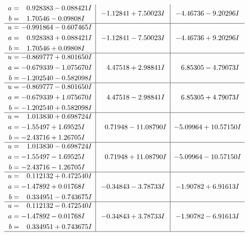 \documentclass[1p]{elsarticle_modified}
\theoremstyle{definition}
\begin{document}
$$\begin{array}{c|c|c}
\begin{aligned}
a &= \phantom{-}0.928383 - 0.088421 I \\
b &= \phantom{-}1.70546 - 0.09808 I\end{aligned}
 & -1.12841 + 7.50023 I & -4.46736 - 9.20296 I \\ \hline\begin{aligned}
u &= -0.991864 - 0.607465 I \\
a &= \phantom{-}0.928383 + 0.088421 I \\
b &= \phantom{-}1.70546 + 0.09808 I\end{aligned}
 & -1.12841 - 7.50023 I & -4.46736 + 9.20296 I \\ \hline\begin{aligned}
u &= -0.869777 + 0.801650 I \\
a &= -0.679339 - 1.075670 I \\
b &= -1.202540 - 0.582098 I\end{aligned}
 & \phantom{-}4.47518 + 2.98841 I & \phantom{-}6.85305 - 4.79073 I \\ \hline\begin{aligned}
u &= -0.869777 - 0.801650 I \\
a &= -0.679339 + 1.075670 I \\
b &= -1.202540 + 0.582098 I\end{aligned}
 & \phantom{-}4.47518 - 2.98841 I & \phantom{-}6.85305 + 4.79073 I \\ \hline\begin{aligned}
u &= \phantom{-}1.013830 + 0.698724 I \\
a &= -1.55497 + 1.69525 I \\
b &= -2.43716 + 1.26705 I\end{aligned}
 & \phantom{-}0.71948 - 11.08790 I & -5.09964 + 10.57150 I \\ \hline\begin{aligned}
u &= \phantom{-}1.013830 - 0.698724 I \\
a &= -1.55497 - 1.69525 I \\
b &= -2.43716 - 1.26705 I\end{aligned}
 & \phantom{-}0.71948 + 11.08790 I & -5.09964 - 10.57150 I \\ \hline\begin{aligned}
u &= \phantom{-}0.112132 + 0.472540 I \\
a &= -1.47892 + 0.01768 I \\
b &= \phantom{-}0.334951 - 0.743675 I\end{aligned}
 & -0.34843 - 3.78733 I & -1.90782 + 6.91613 I \\ \hline\begin{aligned}
u &= \phantom{-}0.112132 - 0.472540 I \\
a &= -1.47892 - 0.01768 I \\
b &= \phantom{-}0.334951 + 0.743675 I\end{aligned}
 & -0.34843 + 3.78733 I & -1.90782 - 6.91613 I\\
 \hline 
 \end{array}$$\newpage\newpage\renewcommand{\arraystretch}{1}
\end{document}
